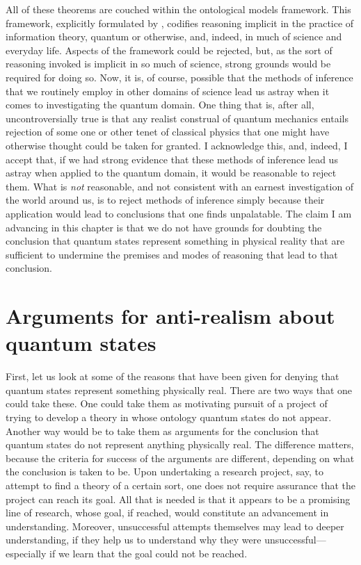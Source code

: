 \documentclass[12pt]{article}
\begin{document}
All of these theorems are couched within the ontological models framework.  This framework, explicitly formulated by \citet{SpekkensHarrigan}, codifies reasoning implicit in the practice of information theory, quantum or otherwise, and, indeed, in much of science and everyday life.  Aspects of the framework could be rejected, but, as the sort of reasoning invoked is implicit in so much of science, strong grounds would be required for doing so.   Now, it is, of course, possible that the methods of inference that we routinely employ in other domains of science lead us astray when it comes to investigating the quantum domain. One thing that is, after all, uncontroversially true is that any realist construal of quantum mechanics  entails rejection of some one or other tenet of classical physics that one might have otherwise thought could be taken for granted.  I acknowledge this, and, indeed, I accept that, if we had strong evidence that these methods of inference lead us astray when applied to the quantum domain, it would be reasonable to reject them.  What is \emph{not} reasonable, and not consistent with an earnest investigation of the world around us, is to reject methods of inference simply because their application would lead to conclusions that one finds unpalatable.  The claim I am advancing in this chapter is that we do not have grounds for doubting the conclusion that quantum states represent something in physical reality that are sufficient to undermine the premises and modes of reasoning that lead to that conclusion.



\section{Arguments for anti-realism about quantum states} First, let us look at  some of the reasons that have been given for denying that quantum states represent something physically real.     There are two ways that one could take these.  One could  take them  as motivating pursuit of a project of trying to develop a theory in whose ontology quantum states do not appear.  Another way would be to take them as arguments for the conclusion that quantum states do not represent anything physically real.  The difference matters, because the criteria for success of the arguments are different, depending on what the conclusion is taken to be.    Upon undertaking a research project, say, to attempt to find a theory of a certain sort, one does not require assurance that the project can reach its goal.  All that is needed is that it appears to be a promising line of research, whose goal, if reached, would constitute an advancement in understanding.  Moreover, unsuccessful attempts themselves may lead to deeper understanding, if they help us to understand why they were unsuccessful---especially if we learn that the goal could not be reached.
\end{document}
